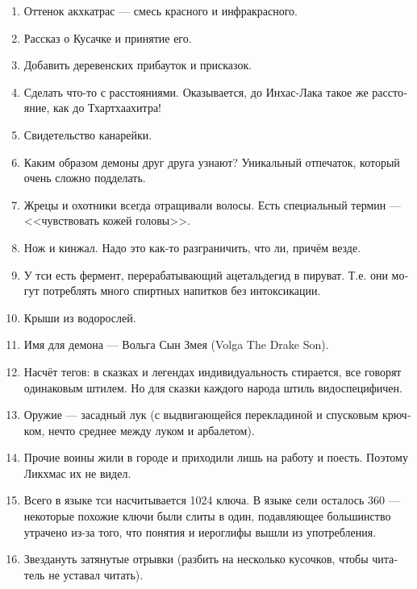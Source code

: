 \documentclass[a4paper,12pt,fleqn]{book}\usepackage{polyglossia}\setdefaultlanguage[babelshorthands=true]{russian}\setotherlanguage{english}\defaultfontfeatures{Ligatures=TeX,Mapping=tex-text}\usepackage{xcolor}\newcommand{\ml}[3]{#2}
\begin{document}
{\begin{enumerate}
\item Оттенок акхкатрас --- смесь красного и инфракрасного.

\item Рассказ о Кусачке и принятие его.

\item Добавить деревенских прибауток и присказок.

\item Сделать что-то с расстояниями.
Оказывается, до Инхас-Лака такое же расстояние, как до Тхартхаахитра!

\item Свидетельство канарейки.

\item Каким образом демоны друг друга узнают?
Уникальный отпечаток, который очень сложно подделать.

\item Жрецы и охотники всегда отращивали волосы.
Есть специальный термин --- <<чувствовать кожей головы>>.

\item Нож и кинжал.
Надо это как-то разграничить, что ли, причём везде.

\item У тси есть фермент, перерабатывающий ацетальдегид в пируват.
Т.е. они могут потреблять много спиртных напитков без интоксикации.

\item Крыши из водорослей.

\item Имя для демона --- Вольга Сын Змея (Volga The Drake Son).

\item Насчёт тегов: в сказках и легендах индивидуальность стирается, все говорят одинаковым штилем.
Но для сказки каждого народа штиль видоспецифичен.

\item Оружие --- засадный лук (с выдвигающейся перекладиной и спусковым крючком, нечто среднее между луком и арбалетом).

\item Прочие воины жили в городе и приходили лишь на работу и поесть.
Поэтому Ликхмас их не видел.

\item Всего в языке тси насчитывается 1024 ключа.
В языке сели осталось 360 --- некоторые похожие ключи были слиты в один, подавляющее большинство утрачено из-за того, что понятия и иероглифы вышли из употребления.

\item Звездануть затянутые отрывки (разбить на несколько кусочков, чтобы читатель не уставал читать).


\end{enumerate}}
\end{document}
